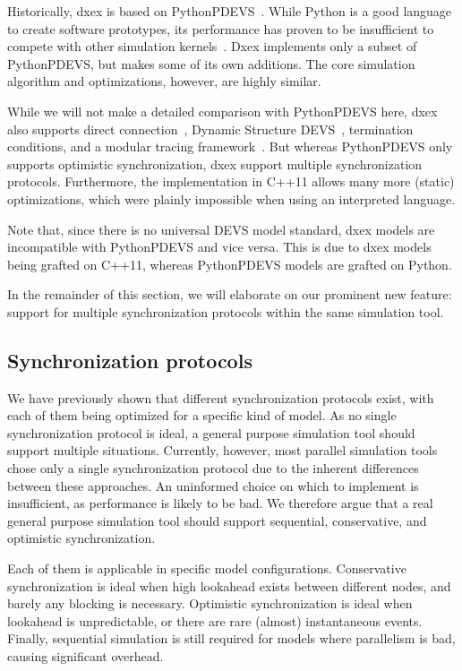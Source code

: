 Historically, dxex is based on PythonPDEVS~\cite{PythonPDEVS}.
While Python is a good language to create software prototypes, its performance has proven to be insufficient to compete with other simulation kernels~\cite{MasterThesis}.
Dxex implements only a subset of PythonPDEVS, but makes some of its own additions.
The core simulation algorithm and optimizations, however, are highly similar.

While we will not make a detailed comparison with PythonPDEVS here, dxex also supports direct connection~\cite{SymbolicFlattening}, \textsf{Dynamic Structure DEVS}~\cite{DSDEVS}, termination conditions, and a modular tracing framework~\cite{PythonPDEVS}.
But whereas PythonPDEVS only supports optimistic synchronization, dxex support multiple synchronization protocols.
Furthermore, the implementation in C++11 allows many more (static) optimizations, which were plainly impossible when using an interpreted language.

Note that, since there is no universal \textsf{DEVS} model standard, dxex models are incompatible with PythonPDEVS and vice versa.
This is due to dxex models being grafted on C++11, whereas PythonPDEVS models are grafted on Python.

In the remainder of this section, we will elaborate on our prominent new feature: support for multiple synchronization protocols within the same simulation tool.

\subsection{Synchronization protocols}
We have previously shown that different synchronization protocols exist, with each of them being optimized for a specific kind of model.
As no single synchronization protocol is ideal, a general purpose simulation tool should support multiple situations.
Currently, however, most parallel simulation tools chose only a single synchronization protocol due to the inherent differences between these approaches.
An uninformed choice on which to implement is insufficient, as performance is likely to be bad.
We therefore argue that a real general purpose simulation tool should support sequential, conservative, and optimistic synchronization.

Each of them is applicable in specific model configurations.
Conservative synchronization is ideal when high lookahead exists between different nodes, and barely any blocking is necessary.
Optimistic synchronization is ideal when lookahead is unpredictable, or there are rare (almost) instantaneous events.
Finally, sequential simulation is still required for models where parallelism is bad, causing significant overhead.

